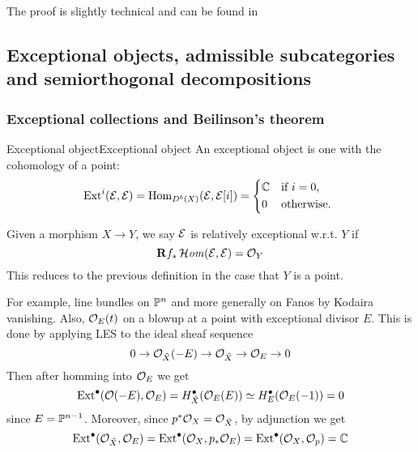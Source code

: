 The proof is slightly technical and can be found in \cite[\S7][Proposition~7.1]{Huybrechts}



\subsection{Exceptional objects, admissible subcategories and semiorthogonal decompositions}

\subsubsection{Exceptional collections and Beilinson's theorem}

\begin{definition}{Exceptional object}{Exceptional object}
    An exceptional object is one with the cohomology of a point:
    \begin{equation*}
        \Ext^i(\calE,\calE) = \Hom_{D^b(X)}(\calE,\calE[i]) = \begin{cases*}
            \C & if $i=0$, \\
            0 & otherwise.
        \end{cases*}
    \end{equation*}

    Given a morphism $X\rightarrow Y$, we say $\calE$ is relatively exceptional w.r.t. $Y$ if $$\dR f_* \lHom(\calE, \calE)=\O_Y$$
    This reduces to the previous definition in the case that $Y$ is a point.
\end{definition}

For example, line bundles on $\P^n$ and more generally on Fanos by Kodaira vanishing. Also, $\O_{E}(t)$ on a blowup at a point with exceptional divisor $E$. This is done by applying LES to the ideal sheaf sequence
\begin{equation*}
    0 \to \O_{\tilde X}(-E) \to \O_{\tilde X} \to \O_E \to 0
\end{equation*}
Then after homming into $\O_E$ we get
\begin{equation*}
    \Ext^\bullet(\O(-E),\O_E)
        = H^\bullet_{\tilde X}(\O_E(E))
        \simeq H^\bullet_E(\O_E(-1))=0
\end{equation*}
since $E=\P^{n-1}$. Moreover, since $p^*\O_X=\O_{\tilde X}$, by adjunction we get
\begin{equation*}
    \Ext^\bullet(\O_{\tilde X},\O_E)
        = \Ext^\bullet(\O_X,p_*\O_E)
        = \Ext^\bullet(\O_X,\O_p)
        = \C
\end{equation*}

